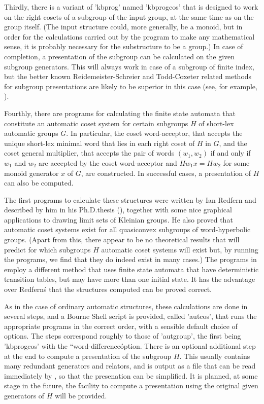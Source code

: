 Thirdly, there is a variant of 'kbprog' named 'kbprogcos' that is designed to
work on the right cosets of a subgroup of the input group, at the same time
as on the group itself. (The input structure could, more generally, be a
monoid, but in order for the calculations carried out by the program to
make any mathematical sense, it is probably necessary for the substructure to be
a group.) In case of completion, a presentation of the subgroup
can be calculated on the given subgroup generators.  This will always work in
case of a subgroup of finite index, but the better known Reidemeister-Schreier
and Todd-Coxeter related methods for subgroup presentations are likely to be
superior in this case (see, for example, \cite {Neu81}).

Fourthly, there are programs for calculating the finite state automata
that constitute an automatic coset system for certain subgroups $H$ of
short-lex automatic groups $G$. In particular, the coset word-acceptor, that
accepts the unique short-lex minimal word that lies in each right coset
of $H$ in $G$, and the coset general multiplier, that accepts the pair of words
$(w_1,w_2)$ if and only if $w_1$ and $w_2$ are accepted by the coset
word-acceptor and $Hw_1x=Hw_2$ for some monoid generator $x$ of $G$, are
constructed. In successful cases, a presentation of $H$ can also be computed. 

The first programs to calculate these structures
were written by Ian Redfern and described by him in his Ph.D.thesis
(\cite{Red93}), together with some nice graphical applications to drawing
limit sets of Kleinian groups. He also proved that automatic coset systems
exist for all quasiconvex subgroups of word-hyperbolic groups. (Apart from
this, there appear to be no theoretical results that will predict for
which subgroups $H$ automatic coset systems will exist but, by running the
programs, we find that they do indeed exist in many cases.)
The programs in {\KBMAG} employ a different method that uses finite state
automata that have deterministic transition tables, but may have more than one
initial state. It has the advantage over Redfern\'s that the structures
computed can be proved correct.

As in the case of ordinary automatic structures, these calculations are
done in several steps, and a Bourne Shell script is provided, called
'autcos', that  runs the appropriate programs in the correct order, with
a sensible default choice of options. The  steps correspond roughly to those of
'autgroup', the first being 'kbprogcos' with the ``word-difference\'\'
option.  There is an optional additional step at the end to compute a
presentation of the subgroup $H$. This usually contains many redundant
generators and relators, and is output as a file that can be read immediately
by {\GAP}, so that the presenation can be simplified. It is planned, at some
stage in the future, the facility to compute a presentation using the original
given generators of $H$ will be provided.

